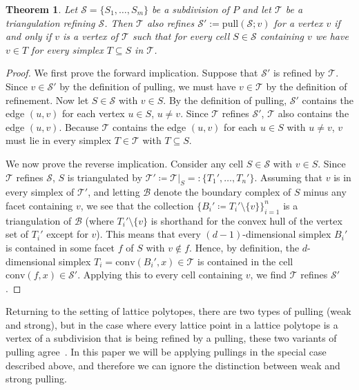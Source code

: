 \documentclass[12pt]{amsart}
\newtheorem{theorem}{Theorem}[section]
\theoremstyle{definition}
\newcommand\calB{\mathcal{B}}
\newcommand\calS{\mathcal{S}}
\newcommand\calT{\mathcal{T}}
\newcommand\conv{\mathrm{conv}}
\newcommand\pull{\mathrm{pull}}
\begin{document}
\begin{theorem}\label{thm:iteratedpulling}
    Let $\calS=\{S_1,\dots,S_m\}$ be a subdivision of $P$ and let $\calT$ be a triangulation refining $\calS$. Then $\calT$ also refines $\calS':=\pull(\calS;v)$ for a vertex $v$ if and only if $v$ is a vertex of $\calT$ such that for every cell $S\in \calS$ containing $v$ we have $v\in T$ for every simplex $T\subseteq S$ in $\calT$.
\end{theorem}
    \begin{proof}
        We first prove the forward implication. Suppose that $\calS'$ is refined by $\calT$. Since $v\in\calS'$ by the definition of pulling, we must have $v\in\calT$ by the definition of refinement. Now let $S\in\calS$ with $v\in S$. By the definition of pulling, $\calS'$ contains the edge $(u,v)$ for each vertex $u\in S$, $u\neq v$. Since $\calT$ refines $\calS'$, $\calT$ also contains the edge $(u,v)$. Because $\calT$ contains the edge $(u,v)$ for each $u\in S$ with $u\neq v$, $v$ must lie in every simplex $T\in\calT$ with $T\subseteq S$. 
        
        We now prove the reverse implication. Consider any cell $S\in \calS$ with $v\in S$. Since $\calT$ refines $\calS$, $S$ is triangulated by
        $\calT' \coloneq \calT\vert_S =: \{T_1',\dots, T_n'\}$.
        Assuming that $v$ is in every simplex of $\calT'$, and letting $\calB$ denote the boundary complex of $S$ minus any facet containing $v$, we see that the collection $\{ B_i'\coloneq T_i'\setminus\{v\}\}_{i=1}^n$ is a triangulation of $\calB$ (where $T_i'\setminus\{v\}$ is shorthand for the convex hull of the vertex set of $T_i'$ except for $v$).
        This means that every $(d-1)$-dimensional simplex $B_i'$ is contained in some facet $f$ of $S$ with $v\notin f$.
        Hence, by definition, the $d$-dimensional simplex $T_i = \conv(B_i',x) \in \calT$ is contained in the cell $\conv(f,x)\in\calS'$.
        Applying this to every cell containing $v$, we find $\calT$ refines $\calS'$.
    \end{proof}

Returning to the setting of lattice polytopes, there are two types of pulling (weak and strong), but in the case where every lattice point in a lattice polytope is a vertex of a subdivision that is being refined by a pulling, these two variants of pulling agree~\cite{unimodulartriangulationssurvey}.
In this paper we will be applying pullings in the special case described above, and therefore we can ignore the distinction between weak and strong pulling.
\end{document}
